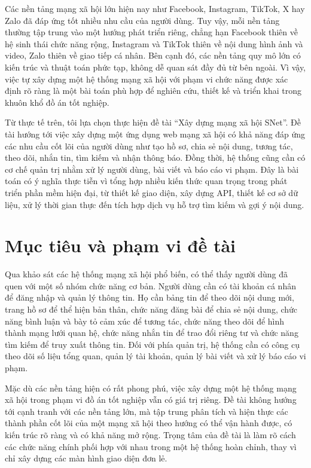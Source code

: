 \documentclass[../DoAn.tex]{subfiles}
\begin{document}
Các nền tảng mạng xã hội lớn hiện nay như Facebook, Instagram, TikTok, X hay Zalo đã đáp ứng tốt nhiều nhu cầu của người dùng. Tuy vậy, mỗi nền tảng thường tập trung vào một hướng phát triển riêng, chẳng hạn Facebook thiên về hệ sinh thái chức năng rộng, Instagram và TikTok thiên về nội dung hình ảnh và video, Zalo thiên về giao tiếp cá nhân. Bên cạnh đó, các nền tảng quy mô lớn có kiến trúc và thuật toán phức tạp, không dễ quan sát đầy đủ từ bên ngoài. Vì vậy, việc tự xây dựng một hệ thống mạng xã hội với phạm vi chức năng được xác định rõ ràng là một bài toán phù hợp để nghiên cứu, thiết kế và triển khai trong khuôn khổ đồ án tốt nghiệp.

Từ thực tế trên, tôi lựa chọn thực hiện đề tài ``Xây dựng mạng xã hội SNet''. Đề tài hướng tới việc xây dựng một ứng dụng web mạng xã hội có khả năng đáp ứng các nhu cầu cốt lõi của người dùng như tạo hồ sơ, chia sẻ nội dung, tương tác, theo dõi, nhắn tin, tìm kiếm và nhận thông báo. Đồng thời, hệ thống cũng cần có cơ chế quản trị nhằm xử lý người dùng, bài viết và báo cáo vi phạm. Đây là bài toán có ý nghĩa thực tiễn vì tổng hợp nhiều kiến thức quan trọng trong phát triển phần mềm hiện đại, từ thiết kế giao diện, xây dựng API, thiết kế cơ sở dữ liệu, xử lý thời gian thực đến tích hợp dịch vụ hỗ trợ tìm kiếm và gợi ý nội dung.

\section{Mục tiêu và phạm vi đề tài}
\label{section:1.2}
Qua khảo sát các hệ thống mạng xã hội phổ biến, có thể thấy người dùng đã quen với một số nhóm chức năng cơ bản. Người dùng cần có tài khoản cá nhân để đăng nhập và quản lý thông tin. Họ cần bảng tin để theo dõi nội dung mới, trang hồ sơ để thể hiện bản thân, chức năng đăng bài để chia sẻ nội dung, chức năng bình luận và bày tỏ cảm xúc để tương tác, chức năng theo dõi để hình thành mạng lưới quan hệ, chức năng nhắn tin để trao đổi riêng tư và chức năng tìm kiếm để truy xuất thông tin. Đối với phía quản trị, hệ thống cần có công cụ theo dõi số liệu tổng quan, quản lý tài khoản, quản lý bài viết và xử lý báo cáo vi phạm.

Mặc dù các nền tảng hiện có rất phong phú, việc xây dựng một hệ thống mạng xã hội trong phạm vi đồ án tốt nghiệp vẫn có giá trị riêng. Đề tài không hướng tới cạnh tranh với các nền tảng lớn, mà tập trung phân tích và hiện thực các thành phần cốt lõi của một mạng xã hội theo hướng có thể vận hành được, có kiến trúc rõ ràng và có khả năng mở rộng. Trọng tâm của đề tài là làm rõ cách các chức năng chính phối hợp với nhau trong một hệ thống hoàn chỉnh, thay vì chỉ xây dựng các màn hình giao diện đơn lẻ.
\end{document}
